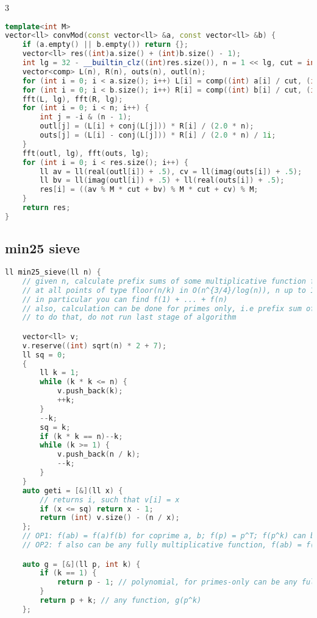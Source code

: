 \documentclass[9pt,a4paper,landscape,twosided]{extarticle}
\begin{document}
\begin{multicols*}{3}
\begin{lstlisting}[language=C++]
template<int M>
vector<ll> convMod(const vector<ll> &a, const vector<ll> &b) {
    if (a.empty() || b.empty()) return {};
    vector<ll> res((int)a.size() + (int)b.size() - 1);
    int lg = 32 - __builtin_clz((int)res.size()), n = 1 << lg, cut = int(sqrt(M));
    vector<comp> L(n), R(n), outs(n), outl(n);
    for (int i = 0; i < a.size(); i++) L[i] = comp((int) a[i] / cut, (int) a[i] % cut);
    for (int i = 0; i < b.size(); i++) R[i] = comp((int) b[i] / cut, (int) b[i] % cut);
    fft(L, lg), fft(R, lg);
    for (int i = 0; i < n; i++) {
        int j = -i & (n - 1);
        outl[j] = (L[i] + conj(L[j])) * R[i] / (2.0 * n);
        outs[j] = (L[i] - conj(L[j])) * R[i] / (2.0 * n) / 1i;
    }
    fft(outl, lg), fft(outs, lg);
    for (int i = 0; i < res.size(); i++) {
        ll av = ll(real(outl[i]) + .5), cv = ll(imag(outs[i]) + .5);
        ll bv = ll(imag(outl[i]) + .5) + ll(real(outs[i]) + .5);
        res[i] = ((av % M * cut + bv) % M * cut + cv) % M;
    }
    return res;
}
\end{lstlisting}

\subsection{min25 sieve}
\begin{lstlisting}[language=C++]
ll min25_sieve(ll n) {
    // given n, calculate prefix sums of some multiplicative function f
    // at all points of type floor(n/k) in O(n^{3/4}/log(n)), n up to 1e11 is ok
    // in particular you can find f(1) + ... + f(n)
    // also, calculation can be done for primes only, i.e prefix sum of f(i)*I{i is prime}
    // to do that, do not run last stage of algorithm

    vector<ll> v;
    v.reserve((int) sqrt(n) * 2 + 7);
    ll sq = 0;
    {
        ll k = 1;
        while (k * k <= n) {
            v.push_back(k);
            ++k;
        }
        --k;
        sq = k;
        if (k * k == n)--k;
        while (k >= 1) {
            v.push_back(n / k);
            --k;
        }
    }
    auto geti = [&](ll x) {
        // returns i, such that v[i] = x
        if (x <= sq) return x - 1;
        return (int) v.size() - (n / x);
    };
    // OP1: f(ab) = f(a)f(b) for coprime a, b; f(p) = p^T; f(p^k) can be calculated in O(1); we denote f(p^k) = g(p, k) (p is prime) for all k
    // OP2: f also can be any fully multiplicative function, f(ab) = f(a)f(b) for all a,b; you need to calc pref sum of f fast, so only prime case is useful

    auto g = [&](ll p, int k) {
        if (k == 1) {
            return p - 1; // polynomial, for primes-only can be any fully multiplicative function
        }
        return p + k; // any function, g(p^k)
    };


\end{lstlisting}
\end{multicols*}
\end{document}

